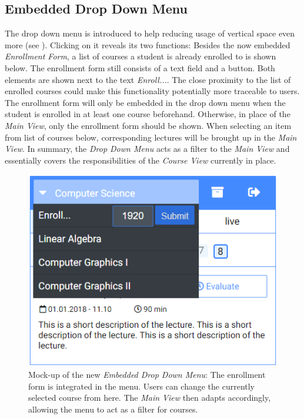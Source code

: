 \subsection{Embedded Drop Down Menu}
\label{section:con:proposals:dropdown}
The drop down menu is introduced to help reducing usage of vertical space even more (see ). Clicking on it reveals its two functions: Besides the now embedded \emph{Enrollment Form}, a list of courses a student is already enrolled to is shown below. The enrollment form still consists of a text field and a button. Both elements are shown next to the text \emph{Enroll...}. The close proximity to the list of enrolled courses could make this functionality potentially more traceable to users. The enrollment form will only be embedded in the drop down menu when the student is enrolled in at least one course beforehand. Otherwise, in place of the \emph{Main View}, only the enrollment form should be shown.
When selecting an item from list of courses below, corresponding lectures will be brought up in the \emph{Main View}.
In summary, the \emph{Drop Down Menu} acts as a filter to the \emph{Main View} and essentially covers the responsibilities of the \emph{Course View} currently in place.

\begin{figure}[ht]
	\begin{minipage}[t]{\textwidth}
		\centering
		\includegraphics[width=.7\textwidth]{mockups/embedded_drop_down.png}
		\captionsetup{width=.8\linewidth}
		\caption{Mock-up of the new \emph{Embedded Drop Down Menu}:
			The enrollment form is integrated in the menu. Users can change the currently selected course from here. The \emph{Main View} then adapts accordingly, allowing the menu to act as a filter for courses.
		}
		\label{figure:embeddeddropdown}
	\end{minipage}
\end{figure}

